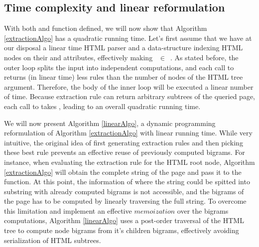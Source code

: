 \similarityAlgo


\subsection{Time complexity and linear reformulation}
With both  and  function defined, we will now show that Algorithm \ref{extractionAlgo} has a quadratic running time. Let's first assume that we have at our disposal a linear time HTML parser and a data-structure indexing HTML nodes on their  and  attributes, effectively making ~$\in$~. As stated before, the outer loop splits the input into independent computations, and each call to  returns (in linear time) less rules than the number of nodes of the HTML tree argument. Therefore, the body of the inner loop will be executed a linear number of time. Because extraction rule can return arbitrary subtrees of the queried page, each call to  takes , leading to an overall quadratic running time.

\linearAlgo

We will now present Algorithm \ref{linearAlgo}, a dynamic programming reformulation of Algorithm \ref{extractionAlgo} with linear running time. While very intuitive, the original idea of first generating extraction rules and then picking these best rule prevents an effective reuse of previously computed bigrams. For instance, when evaluating the extraction rule for the HTML root node, Algorithm \ref{extractionAlgo} will obtain the complete string of the page and pass it to the  function. At this point, the information of where the string could be spitted into substring with already computed bigrams is not accessible, and the bigrams of the page has to be computed by linearly traversing the full string. To overcome this limitation and implement an effective $memoization$ over the bigrams computations, Algorithm \ref{linearAlgo} uses a post-order traversal of the HTML tree to compute node bigrams from it's children bigrams, effectively avoiding serialization of HTML subtrees.


